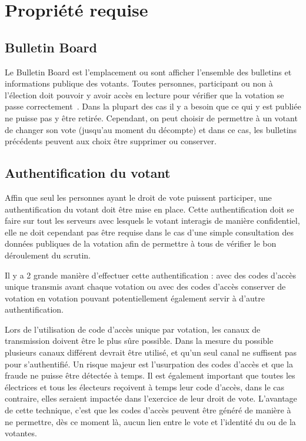 \documentclass[../report]{subfiles}
\begin{document}
\chapter{Propriété requise}
\section{Bulletin Board}

Le Bulletin Board est l'emplacement ou sont afficher l'ensemble des bulletins et informations publique des votants. 
Toutes personnes, participant ou non à l'élection doit pouvoir y avoir accès en lecture pour vérifier que la votation se passe correctement~\cite{gharadaghy_verifiability_2010}.
Dans la plupart des cas il y a besoin que ce qui y est publiée ne puisse pas y être retirée.
Cependant, on peut choisir de permettre à un votant de changer son vote (jusqu'au moment du décompte) et dans ce cas, les bulletins précédents 
peuvent aux choix être supprimer ou conserver.

\section{Authentification du votant}

Affin que seul les personnes ayant le droit de vote puissent participer, une authentification du votant doit être mise en place.
Cette authentification doit se faire sur tout les serveurs avec lesquels le votant interagis de manière confidentiel, elle ne doit
cependant pas être requise dans le cas d'une simple consultation des données publiques de la votation afin de permettre à tous de vérifier
le bon déroulement du scrutin.

Il y a 2 grande manière d'effectuer cette authentification : avec des codes d'accès unique transmis avant chaque votation ou avec des codes d'accès
conserver de votation en votation pouvant potentiellement également servir à d'autre authentification.

Lors de l'utilisation de code d'accès unique par votation, les canaux de transmission doivent être le plus sûre possible.
Dans la mesure du possible plusieurs canaux différent devrait être utilisé, et qu'un seul canal ne suffisent pas pour s'authentifié.
Un risque majeur est l'usurpation des codes d'accès et que la fraude ne puisse être détectée à temps.
Il est également important que toutes les électrices et tous les électeurs reçoivent à temps leur code d'accès, dans le cas contraire, elles 
seraient impactée dans l'exercice de leur droit de vote.
L'avantage de cette technique, c'est que les codes d'accès peuvent être généré de manière à ne permettre, dès ce moment là, aucun lien entre le vote
et l'identité du ou de la votantes.
\end{document}
